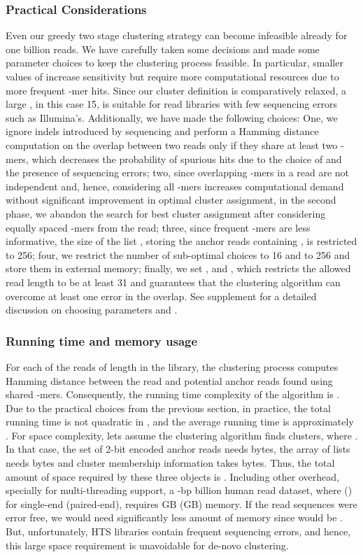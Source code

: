 \documentclass[a4paper]{article}
\begin{document}
\subsubsection{Practical Considerations}
Even our greedy two stage
clustering strategy can become infeasible already for one billion
reads. We have carefully taken some decisions and made some parameter choices
to keep the clustering process feasible. In particular, smaller values of
 increase sensitivity but require more
computational resources due to more frequent -mer hits.
Since our cluster definition is comparatively
relaxed, a large , in this case 15,
is suitable for read libraries with few sequencing errors such as
Illumina's.
Additionally, we have made the following choices:
One, we ignore indels introduced by sequencing and perform a Hamming distance computation on the overlap between two reads
only if they share at least two -mers,
which decreases the probability of spurious hits due to the choice of 
and the presence of sequencing errors;
two, since overlapping -mers in a read are not independent and,
hence, considering all -mers increases computational demand without significant
improvement in optimal cluster assignment,
in the second phase, we abandon the search for best cluster assignment
after considering  equally spaced -mers from the read;
three, since frequent -mers are less informative, the size of the list
, storing the anchor reads containing , is restricted to 256;
four, we restrict the number of sub-optimal choices  to 16 and
 to 256
and store them in external memory;
finally, we set ,  and
,
which restricts the allowed read length to be at least 31 and guarantees
that the clustering algorithm can overcome at least one error
 in the overlap. See supplement
for a detailed discussion on choosing parameters  and .


\subsubsection{Running time and memory usage}
For each of the  reads of length  in the library,
the clustering process computes Hamming distance between the read and
potential anchor reads found using shared -mers.
Consequently, the running time complexity of the algorithm is .
Due to the practical choices from the previous section, in practice,
the total running time is not quadratic in , and the average
running time is approximately .
For space complexity, lets assume the clustering algorithm finds
 clusters, where .
In that case, the set of 2-bit encoded anchor reads  needs
 bytes, the array of lists  needs
 bytes and cluster membership information takes 
bytes. Thus, the total
amount of space required by these three objects is .
Including other overhead, specially for
multi-threading support, a -bp  billion human read
dataset, where  () for single-end
(paired-end), requires GB (GB) memory.
If the read sequences were error free, we would need significantly less
amount of memory since  would be .
But, unfortunately, HTS libraries contain frequent sequencing errors,
and hence, this large space requirement is unavoidable for de-novo clustering.
\end{document}
